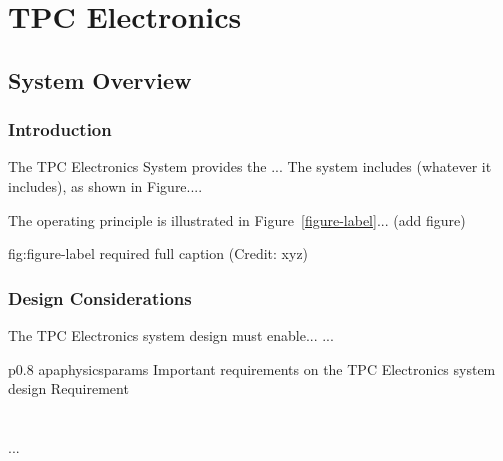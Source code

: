 \chapter{TPC Electronics}
\label{ch:fdsp-tpc-elec}



\section{System Overview}
\label{sec:fdsp-tpc-elec-ov}


\subsection{Introduction}
\label{sec:fdsp-tpc-elec-ov-intro}

The TPC Electronics System provides the ...
The system includes (whatever it includes), as shown in Figure.... 


The operating principle is illustrated in Figure~\ref{figure-label}... (add figure)

\begin{dunefigure}{fig:figure-label}
{required full caption (Credit: xyz)}
\end{dunefigure}

\subsection{Design Considerations}
\label{sec:fdsp-tpc-elec-ov-consid}

The TPC Electronics system design must enable... 
...


\begin{dunetable}
{p{0.8\textwidth}}
{apaphysicsparams}
{Important requirements on the TPC Electronics system design}   
Requirement  \\ \toprowrule
  \\ \colhline
   \\ \colhline
 ...\\ 
\end{dunetable}

